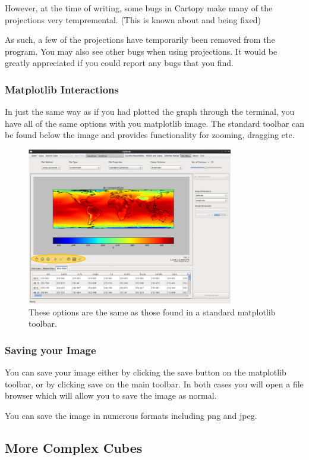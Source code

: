 \documentclass[a4paper,12pt]{article}
\begin{document}
However, at the time of writing, some bugs in Cartopy make many of the
projections very tempremental. (This is known about and being fixed)

As such, a few of the projections have temporarily been removed from the
program. You may also see other bugs when using projections. It would be
greatly appreciated if you could report any bugs that you find.


\subsubsection{Matplotlib Interactions}

In just the same way as if you had plotted the graph through the terminal,
you have all of the same options with you matplotlib image. The standard
toolbar can be found below the image and provides functionality for
zooming, dragging etc.

\begin{figure}[h]
\centering
\includegraphics[width=90mm]{resources/tute10.PNG}
\caption{These options are the same as those found in a standard matplotlib
toolbar.}
\label{overflow}
\end{figure}

\subsubsection{Saving your Image}

You can save your image either by clicking the save button on the matplotlib
toolbar, or by clicking save on the main toolbar. In both cases you will open a
file browser which will allow you to save the image as normal.

You can save the image in numerous formats including png and jpeg.

\subsection{More Complex Cubes}
\end{document}
